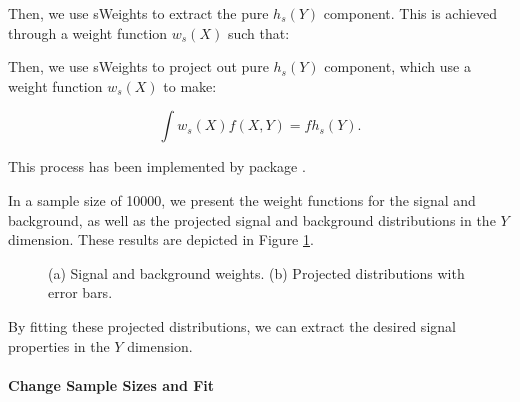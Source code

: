 \documentclass{article}
\begin{document}
Then, we use sWeights to extract the pure $h_s(Y)$ component. This is achieved through a weight function $w_s(X)$ such that:

Then, we use sWeights to project out pure $h_s(Y)$ component, which use a weight function $w_s(X)$ to make:

$$\int w_s(X)f(X,Y)=fh_s(Y).$$

This process has been implemented by  package \cite{DEMBINSKI2022167270}.

In a sample size of 10000, we present the weight functions for the signal and background, as well as the projected signal and background distributions in the $Y$ dimension. These results are depicted in Figure \ref{fig:weights_histograms}.

\begin{figure}[t]
    \centering
    \hspace{0.0\textwidth}
    \caption{(a) Signal and background weights.
(b) Projected distributions with error bars.}
    \label{fig:weights_histograms}
\end{figure}

By fitting these projected distributions, we can extract the desired signal properties in the $Y$ dimension.

\paragraph{Change Sample Sizes and Fit}
\end{document}
